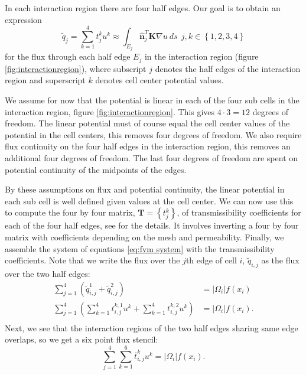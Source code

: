\documentclass[../Main/main.tex]{subfiles}
\begin{document}
	In each interaction region there are four half edges. Our goal is to obtain an expression 
	\begin{equation*}
		\tilde{q}_j  = \sum_{k=1}^4 t^{k}_j u^k  \approx \int_{E_j}\hat{\bm{n}}_j^T \bm{K} \nabla u \  ds \ \ j,k \in \left \{ 1,2,3,4 \right \}
	\end{equation*}
	for the flux through each half edge $E_j$ in the interaction region (figure \ref{fig:interactionregion}), where subscript $j$ denotes the half edges of the interaction region and superscript $k$ denotes cell center potential values.
	\par
	We assume for now that the potential is linear in each of the four sub cells in the interaction region, figure  \ref{fig:interactionregion}. This gives $4\cdot 3 = 12$ degrees of freedom. The linear potential must of course equal the cell center values of the potential in the cell centers, this removes four degrees of freedom. We also require flux continuity on the four half edges in the interaction region, this removes an additional four degrees of freedom. The last four degrees of freedom are spent on potential continuity of the midpoints of the edges. 
	\par
	By these assumptions on flux and potential continuity, the linear potential in each sub cell is well defined given values at the cell center. We can now use this to compute the four by four matrix, $\bm{T}=\left \{ t^{k}_j \right \}$,  of transmissibility coefficients  for each of the four half edges, see \cite{Aavatsmark2002} for the details. It involves inverting a four by four matrix with coefficients depending on the mesh and permeability. Finally, we assemble the system of equations \eqref{eq:fvm system} with the transmissibility coefficients. Note that we write the flux over the $j$th edge of cell $i$, $\tilde{q}_{i,j}$ as the flux over the two half edges:
	\begin{equation*}
		\begin{aligned}
			\sum_{j=1}^4 (\tilde{q}_{i,j}^1 + \tilde{q}_{i,j}^2) &= |\Omega_i|f(x_i) \\
			\sum_{j=1}^4 (\sum_{k=1}^4 t^{k,1}_{i,j}u^k + \sum_{k=1}^4 t^{k,2}_{i,j}u^k)&= |\Omega_i|f(x_i).\\
		\end{aligned}
	\end{equation*}
	Next, we see that the interaction regions of the two half edges sharing same edge overlaps, so we get a six point flux stencil:
	\begin{equation*}
		\sum_{j=1}^4 \sum_{k=1}^6 \overline{t}^{k}_{i,j}u^k = |\Omega_i|f(x_i).
	\end{equation*}
\end{document}
